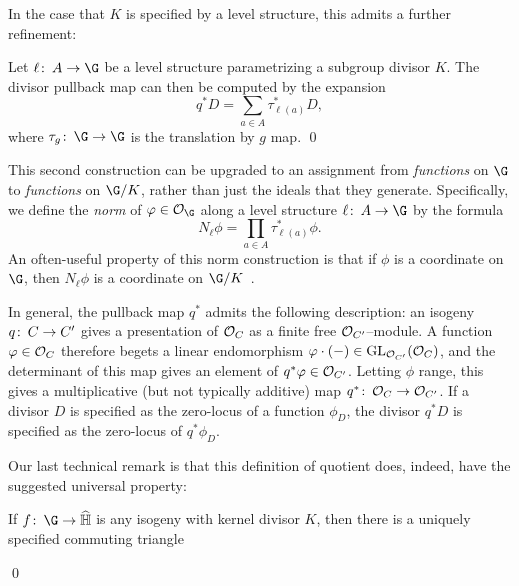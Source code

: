 In the case that $K$ is specified by a level structure, this admits a further refinement:
\begin{corollary}
Let $\ell\co A \to \G$ be a level structure parametrizing a subgroup divisor $K$.  The divisor pullback map can then be computed by the expansion \[q^* D = \sum_{a \in A} \tau_{\ell(a)}^* D,\] where $\tau_g\co \G \to \G$ is the translation by $g$ map. \qed
\end{corollary}

\begin{definition}\label{NormForFns}
This second construction can be upgraded to an assignment from \emph{functions} on $\G$ to \emph{functions} on $\G/K$, rather than just the ideals that they generate.  Specifically, we define the \textit{norm} of $\phi \in \sheaf O_{\G}$ along a level structure $\ell\co A \to \G$ by the formula \[N_\ell \phi = \prod_{a \in A} \tau_{\ell(a)}^* \phi.\]  An often-useful property of this norm construction is that if $\phi$ is a coordinate on $\G$, then $N_\ell \phi$ is a coordinate on $\G/K$~\cite[Theorem 5.3.1]{StricklandFiniteSubgps}.
\end{definition}

\begin{remark}
In general, the pullback map $q^*$ admits the following description: an isogeny $q\colon\thinspace C \to C'$ gives a presentation of $\mathcal{O}_C$ as a finite free $\mathcal{O}_{C'}$--module.  A function $\varphi \in \mathcal{O}_C$ therefore begets a linear endomorphism $\varphi \cdot (-) \in \operatorname{GL}_{\mathcal{O}_{C'}}(\mathcal{O}_C)$, and the determinant of this map gives an element of $q^* \varphi \in \mathcal{O}_{C'}$.  Letting $\phi$ range, this gives a multiplicative (but not typically additive) map $q^*\colon\thinspace \mathcal{O}_C \to \mathcal{O}_{C'}$.  If a divisor $D$ is specified as the zero-locus of a function $\phi_D$, the divisor $q^* D$ is specified as the zero-locus of $q^* \phi_D$.
\end{remark}

Our last technical remark is that this definition of quotient does, indeed, have the suggested universal property:

\begin{lemma}
If $f\co \G \to \widehat{\mathbb H}$ is any isogeny with kernel divisor $K$, then there is a uniquely specified commuting triangle
\begin{center}
\end{center}
\qed
\end{lemma}

